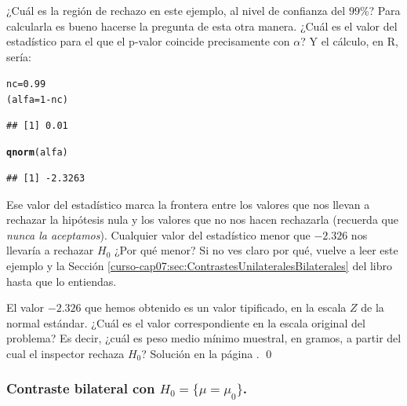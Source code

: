 \documentclass[10pt,a4paper]{article}\usepackage[]{graphicx}\usepackage[]{color}
\makeatletter
\newcommand{\hlnum}[1]{\textcolor[rgb]{0.686,0.059,0.569}{#1}}%
\newcommand{\hlopt}[1]{\textcolor[rgb]{0,0,0}{#1}}%
\newcommand{\hlstd}[1]{\textcolor[rgb]{0.345,0.345,0.345}{#1}}%
\newcommand{\hlkwb}[1]{\textcolor[rgb]{0.69,0.353,0.396}{#1}}%
\newcommand{\hlkwd}[1]{\textcolor[rgb]{0.737,0.353,0.396}{\textbf{#1}}}%
\newenvironment{kframe}{%
 \def\at@end@of@kframe{}%
 \ifinner\ifhmode%
  \def\at@end@of@kframe{\end{minipage}}%
  \begin{minipage}{\columnwidth}%
 \fi\fi%
 \def\FrameCommand##1{\hskip\@totalleftmargin \hskip-\fboxsep
 \colorbox{shadecolor}{##1}\hskip-\fboxsep
     \hskip-\linewidth \hskip-\@totalleftmargin \hskip\columnwidth}%
 \MakeFramed {\advance\hsize-\width
   \@totalleftmargin\z@ \linewidth\hsize
   \@setminipage}}%
 {\par\unskip\endMakeFramed%
 \at@end@of@kframe}
\newenvironment{knitrout}{}{} %
\makeatother
\begin{document}
¿Cuál es la región de rechazo en este ejemplo, al nivel de confianza del $99$\%? Para calcularla es bueno hacerse la pregunta de esta otra manera. ¿Cuál es el valor del estadístico para el que el p-valor coincide precisamente con $\alpha$? Y el cálculo, en R, sería:
\begin{knitrout}
\color{fgcolor}\begin{kframe}
\begin{alltt}
\hlstd{nc} \hlkwb{=} \hlnum{0.99}
\hlstd{(alfa} \hlkwb{=} \hlnum{1} \hlopt{-} \hlstd{nc)}
\end{alltt}
\begin{verbatim}
## [1] 0.01
\end{verbatim}
\begin{alltt}
\hlkwd{qnorm}\hlstd{(alfa)}
\end{alltt}
\begin{verbatim}
## [1] -2.3263
\end{verbatim}
\end{kframe}
\end{knitrout}
Ese valor del estadístico marca la frontera entre los valores que nos llevan a rechazar la hipótesis nula y los valores que no nos hacen rechazarla (recuerda que {\em nunca la aceptamos}).  Cualquier valor del estadístico menor que $-2.326$ nos llevaría a rechazar $H_0$ ¿Por qué menor? Si no ves claro por qué, vuelve a leer este ejemplo y la Sección \ref{curso-cap07:sec:ContrastesUnilateralesBilaterales} del libro hasta que lo entiendas.

\begin{ejercicio}
\label{tut07:ejercicio05}
El valor $-2.326$ que hemos obtenido es un valor tipificado, en la escala $Z$ de la normal estándar.  ¿Cuál es el valor correspondiente en la escala original del problema? Es decir, ¿cuál es peso medio mínimo muestral, en gramos, a partir del cual el inspector rechaza $H_0$? Solución en la página \pageref{tut07:ejercicio05:sol}.
\qed
\end{ejercicio}

\subsubsection{Contraste bilateral con $H_0=\{\mu = \mu_0\}$.}
\end{document}
